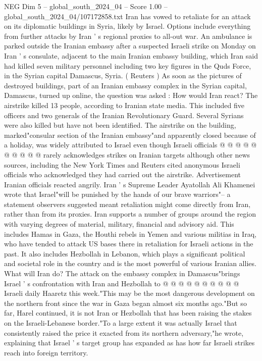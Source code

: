 \begin{textsample}{NEG Dim 5 – global\_south\_2024\_04 – Score 1.00 – global\_south\_2024\_04/107172858.txt}  \label{ex:f5_neg_186}
Iran has vowed to retaliate for an attack on its diplomatic buildings in Syria, likely by Israel.
Options include everything from further attacks by Iran ' s regional proxies to all-out war.
An ambulance is parked outside the Iranian embassy after a suspected Israeli strike on Monday on Iran ' s consulate, adjacent to the main Iranian embassy building, which Iran said had killed seven military personnel including two key figures in the Quds Force, in the Syrian capital Damascus, Syria. ( Reuters ) As soon as the pictures of destroyed buildings, part of an Iranian embassy complex in the Syrian capital, Damascus, turned up online, the question was asked : How would Iran react?
The airstrike killed 13 people, according to Iranian state media.
This included five officers and two generals of the Iranian Revolutionary Guard.
Several Syrians were also killed but have not been identified.
The airstrike on the building, marked"consular section of the Iranian embassy"and apparently closed because of a holiday, was widely attributed to Israel even though Israeli officials @ @ @ @ @ @ @ @ @ @ rarely acknowledges strikes on Iranian targets although other news sources, including the New York Times and Reuters cited anonymous Israeli officials who acknowledged they had carried out the airstrike.
Advertisement Iranian officials reacted angrily.
Iran ' s Supreme Leader Ayatollah Ali Khamenei wrote that Israel"will be punished by the hands of our brave warriors"-- a statement observers suggested meant retaliation might come directly from Iran, rather than from its proxies.
Iran supports a number of groups around the region with varying degrees of material, military, financial and advisory aid.
This includes Hamas in Gaza, the Houthi rebels in Yemen and various militias in Iraq, who have tended to attack US bases there in retaliation for Israeli actions in the past.
It also includes Hezbollah in Lebanon, which plays a significant political and societal role in the country and is the most powerful of various Iranian allies.
What will Iran do?
The attack on the embassy complex in Damascus"brings Israel ' s confrontation with Iran and Hezbollah to @ @ @ @ @ @ @ @ @ @ Israeli daily Haaretz this week."This may be the most dangerous development on the northern front since the war in Gaza began almost six months ago."But so far, Harel continued, it is not Iran or Hezbollah that has been raising the stakes on the Israeli-Lebanese border."To a large extent it was actually Israel that consistently raised the price it exacted from its northern adversary,"he wrote, explaining that Israel ' s target group has expanded as has how far Israeli strikes reach into foreign territory.

\end{textsample}
